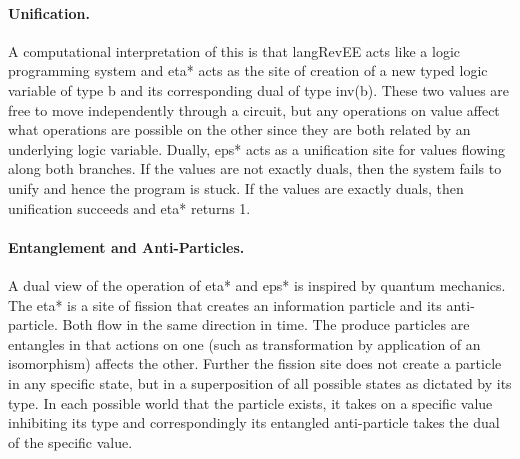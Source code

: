 \documentclass[preprint]{sigplanconf}
\begin{document}
\begin{multicols}{2}
\begin{center}
\end{center}

\begin{center}
\end{center}  
\end{multicols}

\paragraph*{Unification.}
A computational interpretation of this is that {{langRevEE}} acts like
a logic programming system and {{eta*}} acts as the site of creation
of a new typed logic variable of type {{b}} and its corresponding dual
of type {{inv(b)}}. These two values are free to move independently
through a circuit, but any operations on value affect what operations
are possible on the other since they are both related by an underlying
logic variable. Dually, {{eps*}} acts as a unification site for values
flowing along both branches. If the values are not exactly duals, then
the system fails to unify and hence the program is stuck. If the
values are exactly duals, then unification succeeds and {{eta*}}
returns {{1}}.

\paragraph*{Entanglement and Anti-Particles.}
A dual view of the operation of {{eta*}} and {{eps*}} is inspired by
quantum mechanics. The {{eta*}} is a site of fission that creates an
information particle and its anti-particle. Both flow in the same
direction in time. The produce particles are entangles in that actions
on one (such as transformation by application of an isomorphism)
affects the other. Further the fission site does not create a particle
in any specific state, but in a superposition of all possible states
as dictated by its type. In each possible world that the particle
exists, it takes on a specific value inhibiting its type and
correspondingly its entangled anti-particle takes the dual of the
specific value.
\end{document}
